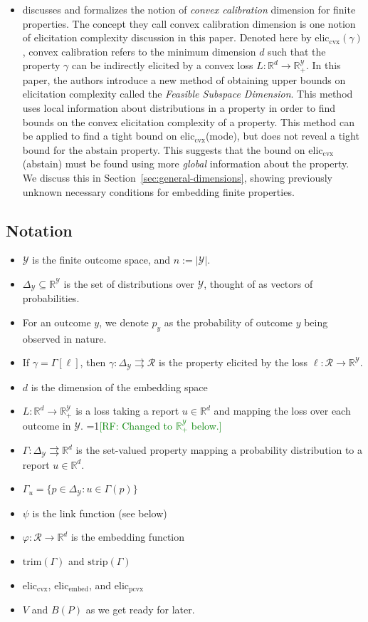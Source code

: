 \documentclass[anon,12pt]{colt2019}
\newcommand{\Comments}{1}
\newcommand{\mynote}[2]{\ifnum\Comments=1\textcolor{#1}{#2}\fi}
\newcommand{\raf}[1]{\mynote{green}{[RF: #1]}}
\newcommand{\reals}{\mathbb{R}}
\newcommand{\prop}[1]{\Gamma[#1]}
\newcommand{\eliccvx}{\mathrm{elic}_\mathrm{cvx}}
\newcommand{\elicpoly}{\mathrm{elic}_\mathrm{pcvx}}
\newcommand{\elicembed}{\mathrm{elic}_\mathrm{embed}}
\newcommand{\simplex}{\Delta_\Y}
\newcommand{\R}{\mathcal{R}}
\newcommand{\Y}{\mathcal{Y}}
\newcommand{\toto}{\rightrightarrows}
\newcommand{\strip}{\mathrm{strip}}
\newcommand{\trim}{\mathrm{trim}}
\begin{document}
\begin{itemize}
  \item \cite{ramaswamy2016convex} discusses and formalizes the notion of \emph{convex calibration} dimension for finite properties.
  The concept they call convex calibration dimension is one notion of elicitation complexity discussion in this paper.
  Denoted here by $\eliccvx(\gamma)$, convex calibration refers to the minimum dimension $d$ such that the property $\gamma$ can be indirectly elicited by a convex loss $L:\reals^d \to \reals^\Y_+$.
  In this paper, the authors introduce a new method of obtaining upper bounds on elicitation complexity called the \emph{Feasible Subspace Dimension}.
  This method uses local information about distributions in a property in order to find bounds on the convex elicitation complexity of a property.
  This method can be applied to find a tight bound on $\eliccvx$(mode), but does not reveal a tight bound for the abstain property.
  This suggests that the bound on $\eliccvx$(abstain) must be found using more \emph{global} information about the property.
  We discuss this in Section~\ref{sec:general-dimensions}, showing previously unknown necessary conditions for embedding finite properties.
\end{itemize}

\subsection{Notation}
\begin{itemize}
  \item $\Y$ is the finite outcome space, and $n := |\Y|$.
  \item $\simplex\subseteq\reals^\Y$ is the set of distributions over $\Y$, thought of as vectors of probabilities.
  \item For an outcome $y$, we denote $p_y$ as the probability of outcome $y$ being observed in nature.
  \item If $\gamma = \prop{\ell}$, then $\gamma:\simplex \toto \R$ is the property elicited by the loss $\ell: \R \to \reals^\Y$.
  \item $d$ is the dimension of the embedding space
  \item $L:\reals^d \to \reals^\Y_+$ is a loss taking a report $u \in \reals^d$ and mapping the loss over each outcome in $\Y$. \raf{Changed to $\reals^\Y_+$ below.}
  \item $\Gamma: \simplex \toto \reals^d$ is the set-valued property mapping a probability distribution to a report $u \in \reals^d$.
  \item $\Gamma_u = \{ p \in \simplex : u \in \Gamma(p) \}$
  \item $\psi$ is the link function (see below)
  \item $\varphi:\R \to \reals^d$ is the embedding function
  \item $\trim(\Gamma)$ and $\strip(\Gamma)$
  \item $\eliccvx$, $\elicembed$, and $\elicpoly$
  \item $V$ and $B(P)$ as we get ready for later.
\end{itemize}
\end{document}
